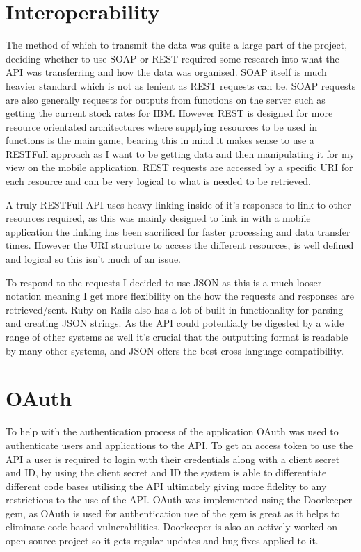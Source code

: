 	\section{Interoperability}
		The method of which to transmit the data was quite a large part of the project, deciding whether to use SOAP or REST required some research into what the API was transferring and how the data was organised. SOAP itself is much heavier standard which is not as lenient as REST requests can be. SOAP requests are also generally requests for outputs from functions on the server such as getting the current stock rates for IBM. However REST is designed for more resource orientated architectures where supplying resources to be used in functions is the main game, bearing this in mind it makes sense to use a RESTFull approach as I want to be getting data and then manipulating it for my view on the mobile application. REST requests are accessed by a specific URI for each resource and can be very logical to what is needed to be retrieved. 

		A truly RESTFull API uses heavy linking inside of it's  responses to link to other resources required, as this was mainly designed to link in with a mobile application the linking has been sacrificed for faster processing and data transfer times. However the URI structure to access the different resources, is well defined and logical so this isn't much of an issue.

		To respond to the requests I decided to use JSON as this is a much looser notation meaning I get more flexibility on the how the requests and responses are retrieved/sent. Ruby on Rails also has a lot of built-in functionality for parsing and creating JSON strings. As the API could potentially be digested by a wide range of other systems as well it's crucial that the outputting format is readable by many other systems, and JSON offers the best cross language compatibility. 

	\section{OAuth}
		To help with the authentication process of the application OAuth was used to authenticate users and applications to the API. To get an access token to use the API a user is required to login with their credentials along with a client secret and ID, by using the client secret and ID the system is able to differentiate different code bases utilising the API ultimately giving more fidelity to  any restrictions to the use of the API. OAuth was implemented using the Doorkeeper gem, as OAuth is used for authentication use of the gem is great as it helps to eliminate code based vulnerabilities. Doorkeeper is also an actively worked on open source project so it gets regular updates and bug fixes applied to it. 

